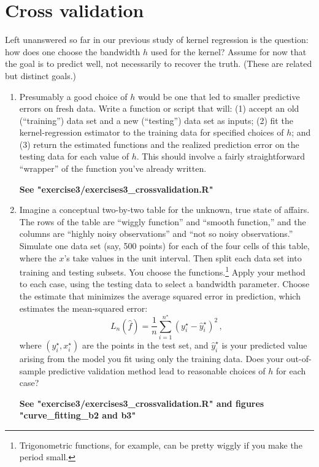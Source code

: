 \documentclass{homework}
\newcommand{\1}{\mathbf{1}}
\begin{document}
\section{Cross validation}

Left unanswered so far in our previous study of kernel regression is the question: how does one choose the bandwidth $h$ used for the kernel?  Assume for now that the goal is to predict well, not necessarily to recover the truth.  (These are related but distinct goals.)  

\begin{enumerate}[label=(\Alph*)]


\item  Presumably a good choice of $h$ would be one that led to smaller predictive errors on fresh data.  Write a function or script that will: (1) accept an old (``training'') data set and a new (``testing'') data set as inputs; (2) fit the kernel-regression estimator to the training data for specified choices of $h$; and (3) return the estimated functions and the realized prediction error on the testing data for each value of $h$.  This should involve a fairly straightforward ``wrapper'' of the function you've already written.

\textbf{See "exercise3/exercises3\_crossvalidation.R"}

\item Imagine a conceptual two-by-two table for the unknown, true state of affairs.  The rows of the table are ``wiggly function'' and ``smooth function,'' and the columns are ``highly noisy observations'' and ``not so noisy observations.''  Simulate one data set (say, 500 points) for each of the four cells of this table, where the $x$'s take values in the unit interval.  Then split each data set into training and testing subsets.  You choose the functions.\footnote{Trigonometric functions, for example, can be pretty wiggly if you make the period small.}   Apply your method to each case, using the testing data to select a bandwidth parameter.  Choose the estimate that minimizes the average squared error in prediction, which estimates the mean-squared error:
$$
L_n(\hat{f}) = \frac{1}{n}\sum_{i=1}^{n^{\star}} (y^{\star}_i - \hat{y}_i^{\star} )^2 \, ,
$$
where $(y_i^{\star}, x_i^{\star})$ are the points in the test set, and $ \hat{y}_i^{\star}$ is your predicted value arising from the model you fit using only the training data.  Does your out-of-sample predictive validation method lead to reasonable choices of $h$ for each case?

\textbf{See "exercise3/exercises3\_crossvalidation.R" and figures "curve\_fitting\_b2 and b3"}


\end{enumerate}
\end{document}
